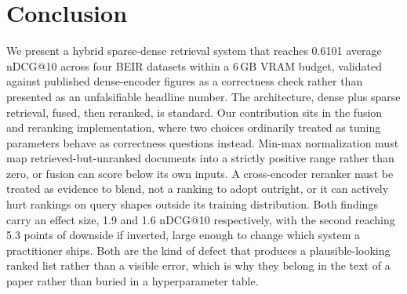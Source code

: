 \documentclass[11pt]{article}
\begin{document}
\section{Conclusion}

We present a hybrid sparse-dense retrieval system that reaches 0.6101 average nDCG@10 across four BEIR datasets within a 6\,GB VRAM budget, validated against published dense-encoder figures as a correctness check rather than presented as an unfalsifiable headline number. The architecture, dense plus sparse retrieval, fused, then reranked, is standard. Our contribution sits in the fusion and reranking implementation, where two choices ordinarily treated as tuning parameters behave as correctness questions instead. Min-max normalization must map retrieved-but-unranked documents into a strictly positive range rather than zero, or fusion can score below its own inputs. A cross-encoder reranker must be treated as evidence to blend, not a ranking to adopt outright, or it can actively hurt rankings on query shapes outside its training distribution. Both findings carry an effect size, 1.9 and 1.6 nDCG@10 respectively, with the second reaching 5.3 points of downside if inverted, large enough to change which system a practitioner ships. Both are the kind of defect that produces a plausible-looking ranked list rather than a visible error, which is why they belong in the text of a paper rather than buried in a hyperparameter table.
\end{document}
